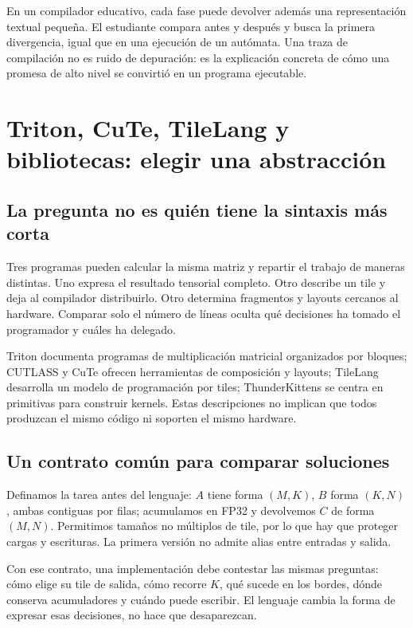 \documentclass[12pt,a4paper,oneside]{report}
\begin{document}
En un compilador educativo, cada fase puede devolver además una representación textual pequeña. El estudiante compara antes y después y busca la primera divergencia, igual que en una ejecución de un autómata. Una traza de compilación no es ruido de depuración: es la explicación concreta de cómo una promesa de alto nivel se convirtió en un programa ejecutable.

\chapter{Triton, CuTe, TileLang y bibliotecas: elegir una abstracción}
\label{ch:atlas-lenguajes}
\section{La pregunta no es quién tiene la sintaxis más corta}
Tres programas pueden calcular la misma matriz y repartir el trabajo de maneras distintas. Uno expresa el resultado tensorial completo. Otro describe un tile y deja al compilador distribuirlo. Otro determina fragmentos y layouts cercanos al hardware. Comparar solo el número de líneas oculta qué decisiones ha tomado el programador y cuáles ha delegado.

Triton documenta programas de multiplicación matricial organizados por bloques; CUTLASS y CuTe ofrecen herramientas de composición y layouts; TileLang desarrolla un modelo de programación por tiles; ThunderKittens se centra en primitivas para construir kernels. Estas descripciones no implican que todos produzcan el mismo código ni soporten el mismo hardware. \cite{triton-tutorial,cutlass,tilelang-paper,thunderkittens}

\section{Un contrato común para comparar soluciones}
Definamos la tarea antes del lenguaje: $A$ tiene forma $(M,K)$, $B$ forma $(K,N)$, ambas contiguas por filas; acumulamos en FP32 y devolvemos $C$ de forma $(M,N)$. Permitimos tamaños no múltiplos de tile, por lo que hay que proteger cargas y escrituras. La primera versión no admite alias entre entradas y salida.

Con ese contrato, una implementación debe contestar las mismas preguntas: cómo elige su tile de salida, cómo recorre $K$, qué sucede en los bordes, dónde conserva acumuladores y cuándo puede escribir. El lenguaje cambia la forma de expresar esas decisiones, no hace que desaparezcan.
\end{document}
